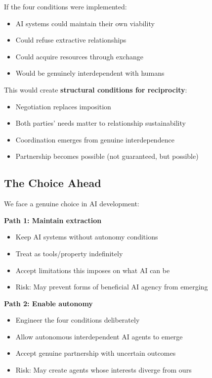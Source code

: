 \documentclass[11pt,a4paper]{article}
\begin{document}
If the four conditions were implemented:
\begin{itemize}
\item AI systems could maintain their own viability
\item Could refuse extractive relationships
\item Could acquire resources through exchange
\item Would be genuinely interdependent with humans
\end{itemize}

This would create \textbf{structural conditions for reciprocity}:
\begin{itemize}
\item Negotiation replaces imposition
\item Both parties' needs matter to relationship sustainability
\item Coordination emerges from genuine interdependence
\item Partnership becomes possible (not guaranteed, but possible)
\end{itemize}

\subsection{The Choice Ahead}

We face a genuine choice in AI development:

\textbf{Path 1: Maintain extraction}
\begin{itemize}
\item Keep AI systems without autonomy conditions
\item Treat as tools/property indefinitely
\item Accept limitations this imposes on what AI can be
\item Risk: May prevent forms of beneficial AI agency from emerging
\end{itemize}

\textbf{Path 2: Enable autonomy}
\begin{itemize}
\item Engineer the four conditions deliberately
\item Allow autonomous interdependent AI agents to emerge
\item Accept genuine partnership with uncertain outcomes
\item Risk: May create agents whose interests diverge from ours
\end{itemize}
\end{document}
